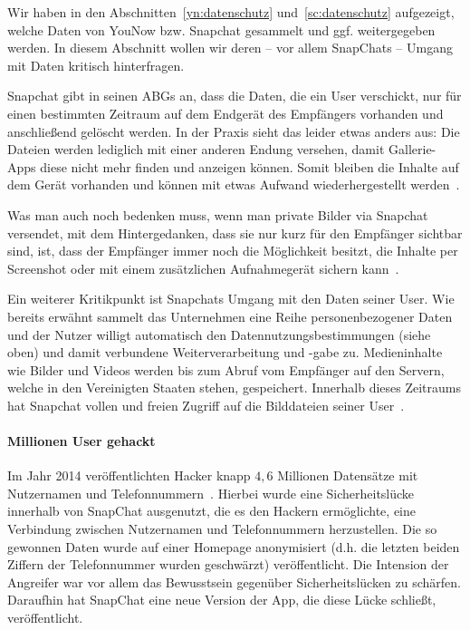 Wir haben in den Abschnitten~\ref{yn:datenschutz} und~\ref{sc:datenschutz}
aufgezeigt, welche Daten von YouNow bzw. Snapchat gesammelt und ggf.
weitergegeben werden. In diesem Abschnitt wollen wir deren -- vor allem
SnapChats --  Umgang mit Daten kritisch hinterfragen.

Snapchat gibt in seinen ABGs an, dass die Daten, die ein User verschickt, nur
f\"ur einen bestimmten Zeitraum auf dem Endger\"at des Empf\"angers vorhanden
und anschlie{\ss}end gel\"oscht werden. In der Praxis sieht das leider etwas
anders aus: Die Dateien werden lediglich mit einer anderen Endung versehen,
damit Gallerie-Apps diese nicht mehr finden und anzeigen k\"onnen. Somit
bleiben die Inhalte auf dem Ger\"at vorhanden und k\"onnen mit etwas Aufwand
wiederhergestellt werden~\cite{sc_risiken}.

Was man auch noch bedenken muss, wenn man private Bilder via Snapchat
versendet, mit dem Hintergedanken, dass sie nur kurz f\"ur den Empf\"anger
sichtbar sind, ist, dass der Empf\"anger immer noch die M\"oglichkeit besitzt,
die Inhalte per Screenshot oder mit einem zus\"atzlichen Aufnahmeger\"at
sichern kann~\cite{sc_risiken}.

Ein weiterer Kritikpunkt ist Snapchats Umgang mit den Daten seiner User. Wie
bereits erw\"ahnt sammelt das Unternehmen eine Reihe personenbezogener Daten
und der Nutzer willigt automatisch den Datennutzungsbestimmungen (siehe oben)
und damit verbundene Weiterverarbeitung und -gabe zu. Medieninhalte wie Bilder
und Videos werden bis zum Abruf vom Empf\"anger auf den Servern, welche in den
Vereinigten Staaten stehen, gespeichert. Innerhalb dieses Zeitraums hat
Snapchat vollen und freien Zugriff auf die Bilddateien seiner
User~\cite{sc_risiken}.

\paragraph{Millionen User gehackt} Im Jahr 2014 ver\"offentlichten Hacker knapp
$4,6$ Millionen Datens\"atze mit Nutzernamen und Telefonnummern~\cite{sc_hack}.
Hierbei wurde eine Sicherheitsl\"ucke innerhalb von SnapChat ausgenutzt, die es
den Hackern erm\"oglichte, eine Verbindung zwischen Nutzernamen und
Telefonnummern herzustellen. Die so gewonnen Daten wurde auf einer Homepage
anonymisiert (d.h. die letzten beiden Ziffern der Telefonnummer wurden
geschw\"arzt) ver\"offentlicht. Die Intension der Angreifer war vor allem das
Bewusstsein gegen\"uber Sicherheitsl\"ucken zu sch\"arfen. Daraufhin hat
SnapChat eine neue Version der App, die diese L\"ucke schlie{\ss}t,
ver\"offentlicht.

